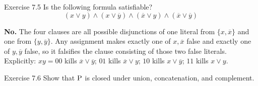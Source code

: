 \begin{question}{Exercise 7.5}
Is the following formula satisfiable?
\[
(x\lor y)\land(x\lor\overline{y})\land(\overline{x}\lor y)\land(\overline{x}\lor\overline{y})
\]
\end{question}
\begin{soln}
\textbf{No.} The four clauses are all possible disjunctions of one literal from $\{x,\overline{x}\}$ and one from $\{y,\overline{y}\}$. Any assignment makes exactly one of $x,\overline{x}$ false and exactly one of $y,\overline{y}$ false, so it falsifies the clause consisting of those two false literals. Explicitly: $xy{=}00$ kills $\overline{x}\lor\overline{y}$; $01$ kills $\overline{x}\lor y$; $10$ kills $x\lor\overline{y}$; $11$ kills $x\lor y$.
\end{soln}

\begin{question}{Exercise 7.6}
Show that $\mathrm{P}$ is closed under union, concatenation, and complement.
\end{question}
